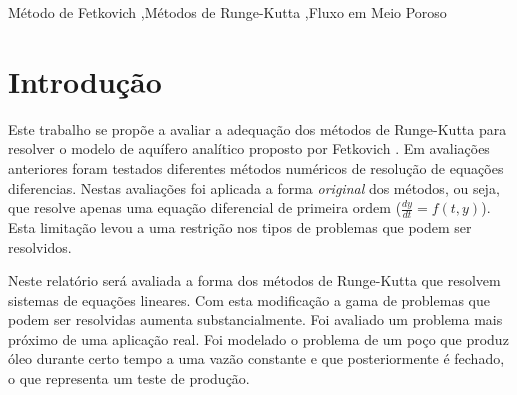 \documentclass[final,5p]{elsarticle}
\numberwithin{equation}{section}
\begin{document}
\begin{frontmatter}
\begin{abstract}
\end{abstract}




\begin{keyword}
    Método de Fetkovich \sep Métodos de Runge-Kutta \sep Fluxo em Meio Poroso



\end{keyword}

\end{frontmatter}


\section{Introdução}

    Este trabalho se propõe a avaliar a adequação dos métodos de Runge-Kutta para resolver o modelo de aquífero analítico proposto por Fetkovich \cite{fetkovich1971simplified}. Em avaliações anteriores \cite{relatorioeuler}\cite{relatoriorungekutta}\cite{relatorioadams} foram testados diferentes métodos numéricos de resolução de equações diferencias. Nestas avaliações foi aplicada a forma \emph{original} dos métodos, ou seja, que resolve apenas uma equação diferencial de primeira ordem ($\frac{dy}{dt}=f(t,y)$). Esta limitação levou a uma restrição nos tipos de problemas que podem ser resolvidos.

    Neste relatório será avaliada a forma dos métodos de Runge-Kutta que resolvem sistemas de equações lineares. Com esta modificação a gama de problemas que podem ser resolvidas aumenta substancialmente. Foi avaliado um problema mais próximo de uma aplicação real. Foi modelado o problema de um poço que produz óleo durante certo tempo a uma vazão constante e que posteriormente é fechado, o que representa um teste de produção.
\end{document}
